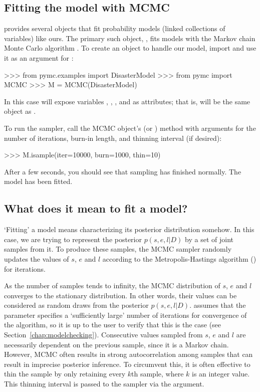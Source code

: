 \documentclass[]{jss}
\begin{document}
\subsection{Fitting the model with MCMC}

 provides several objects that fit probability models (linked collections of variables) like ours. The primary such object, , fits models with the Markov chain Monte Carlo algorithm \citep{Gamerman:1997tb}. To create an  object to handle our model, import  and use it as an argument for :
\begin{CodeInput}
>>> from pymc.examples import DisasterModel
>>> from pymc import MCMC
>>> M = MCMC(DisasterModel)
\end{CodeInput}
In this case  will expose variables , , ,  and  as attributes; that is,  will be the same object as .

To run the sampler, call the MCMC object's  (or ) method with arguments for the number of iterations, burn-in length, and thinning interval (if desired):
\begin{CodeInput}
>>> M.isample(iter=10000, burn=1000, thin=10)
\end{CodeInput}
After a few seconds, you should see that sampling has finished normally. The model has been fitted.

\subsection{What does it mean to fit a model?}

`Fitting' a model means characterizing its posterior distribution somehow. In this case, we are trying to represent the posterior $p(s,e,l|D)$ by a set of joint samples from it. To produce these samples, the MCMC sampler randomly updates the values of $s$, $e$ and $l$ according to the Metropolis-Hastings algorithm (\citet{gelman}) for   iterations.

As the number of samples tends to infinity, the MCMC distribution of $s$, $e$
and $l$ converges to the stationary distribution. In other words, their
values can be considered as random draws from the posterior $p(s,e,l|D)$.
 assumes that the  parameter specifies a `sufficiently large'
number of iterations for convergence of the algorithm, so it is up to the user
to verify
that this is the case (see Section~\ref{chap:modelchecking}). Consecutive values
sampled from $s$, $e$ and $l$ are necessarily dependent on the previous sample,
since it is a Markov chain. However, MCMC often results in strong
autocorrelation among samples that can result in imprecise posterior inference.
To circumvent this, it is often effective to thin the sample by only retaining
every $k$th sample, where $k$ is an integer value. This thinning interval is
passed to the sampler via the  argument.
\end{document}
